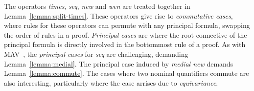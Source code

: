 \documentclass[UKenglish,acmsmall,authorversion]{acmart}
\newcommand{\tohide}[2]{#1} %
\theoremstyle{plain}
\begin{document}
The operators \textit{times}, \textit{seq}, \textit{new} and \textit{wen} are treated together in Lemma~\ref{lemma:split-times}.
These operators give rise to \textit{commutative cases}, where rules for these operators can permute with any principal formula, swapping the order of rules in a proof.
\textit{Principal cases} are where the root connective of the principal formula is directly involved in the bottommost rule of a proof.
As with \textsf{MAV}~\cite{Horne2015}, the \textit{principal cases} for \textit{seq} are challenging, demanding Lemma~\ref{lemma:medial}.
The principal case induced by \textit{medial new} demands Lemma~\ref{lemma:commute}. The cases where two nominal quantifiers commute are also interesting, particularly where the case arrises due to \textit{equivariance}.
\end{document}
